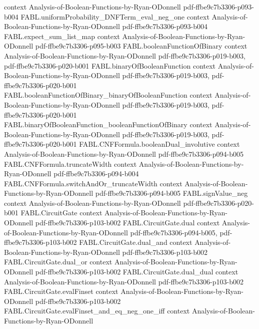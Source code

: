 \begin{theorem}
  {context}
  {Analysis-of-Boolean-Functions-by-Ryan-ODonnell}
  {pdf-ffbe9c7b3306-p093-b004}
\proofstep
  {FABL.uniformProbability_DNFTerm_eval_neg_one}
  {context}
  {Analysis-of-Boolean-Functions-by-Ryan-ODonnell}
  {pdf-ffbe9c7b3306-p093-b004}
\proofstep
  {FABL.expect_sum_list_map}
  {context}
  {Analysis-of-Boolean-Functions-by-Ryan-ODonnell}
  {pdf-ffbe9c7b3306-p095-b003}
\proofstep
  {FABL.booleanFunctionOfBinary}
  {context}
  {Analysis-of-Boolean-Functions-by-Ryan-ODonnell}
  {pdf-ffbe9c7b3306-p019-b003,
    pdf-ffbe9c7b3306-p020-b001}
\proofstep
  {FABL.binaryOfBooleanFunction}
  {context}
  {Analysis-of-Boolean-Functions-by-Ryan-ODonnell}
  {pdf-ffbe9c7b3306-p019-b003,
    pdf-ffbe9c7b3306-p020-b001}
\proofstep
  {FABL.booleanFunctionOfBinary_binaryOfBooleanFunction}
  {context}
  {Analysis-of-Boolean-Functions-by-Ryan-ODonnell}
  {pdf-ffbe9c7b3306-p019-b003,
    pdf-ffbe9c7b3306-p020-b001}
\proofstep
  {FABL.binaryOfBooleanFunction_booleanFunctionOfBinary}
  {context}
  {Analysis-of-Boolean-Functions-by-Ryan-ODonnell}
  {pdf-ffbe9c7b3306-p019-b003,
    pdf-ffbe9c7b3306-p020-b001}
\proofstep
  {FABL.CNFFormula.booleanDual_involutive}
  {context}
  {Analysis-of-Boolean-Functions-by-Ryan-ODonnell}
  {pdf-ffbe9c7b3306-p094-b005}
\proofstep
  {FABL.CNFFormula.truncateWidth}
  {context}
  {Analysis-of-Boolean-Functions-by-Ryan-ODonnell}
  {pdf-ffbe9c7b3306-p094-b004}
\proofstep
  {FABL.CNFFormula.switchAndOr_truncateWidth}
  {context}
  {Analysis-of-Boolean-Functions-by-Ryan-ODonnell}
  {pdf-ffbe9c7b3306-p094-b005}
\proofstep
  {FABL.signValue_neg}
  {context}
  {Analysis-of-Boolean-Functions-by-Ryan-ODonnell}
  {pdf-ffbe9c7b3306-p020-b001}
\proofstep
  {FABL.CircuitGate}
  {context}
  {Analysis-of-Boolean-Functions-by-Ryan-ODonnell}
  {pdf-ffbe9c7b3306-p103-b002}
\proofstep
  {FABL.CircuitGate.dual}
  {context}
  {Analysis-of-Boolean-Functions-by-Ryan-ODonnell}
  {pdf-ffbe9c7b3306-p094-b005,
    pdf-ffbe9c7b3306-p103-b002}
\proofstep
  {FABL.CircuitGate.dual_and}
  {context}
  {Analysis-of-Boolean-Functions-by-Ryan-ODonnell}
  {pdf-ffbe9c7b3306-p103-b002}
\proofstep
  {FABL.CircuitGate.dual_or}
  {context}
  {Analysis-of-Boolean-Functions-by-Ryan-ODonnell}
  {pdf-ffbe9c7b3306-p103-b002}
\proofstep
  {FABL.CircuitGate.dual_dual}
  {context}
  {Analysis-of-Boolean-Functions-by-Ryan-ODonnell}
  {pdf-ffbe9c7b3306-p103-b002}
\proofstep
  {FABL.CircuitGate.evalFinset}
  {context}
  {Analysis-of-Boolean-Functions-by-Ryan-ODonnell}
  {pdf-ffbe9c7b3306-p103-b002}
\proofstep
  {FABL.CircuitGate.evalFinset_and_eq_neg_one_iff}
  {context}
  {Analysis-of-Boolean-Functions-by-Ryan-ODonnell}

\end{theorem}
